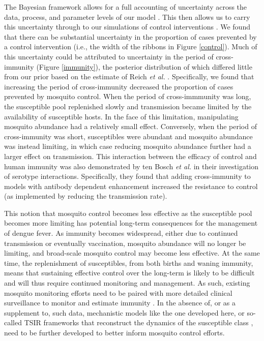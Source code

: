 \documentclass[10pt,letterpaper]{article}
\begin{document}
The Bayesian framework allows for a full accounting of uncertainty across the data, process, and parameter levels of our model \cite{Berliner1996}.
This then allows us to carry this uncertainty through to our simulations of control interventions \cite{Elderd2006}.
We found that there can be substantial uncertainty in the proportion of cases prevented by a control intervention (i.e., the width of the ribbons in Figure \ref{control}).
Much of this uncertainty could be attributed to uncertainty in the period of cross-immunity (Figure \ref{immunity}), the posterior distribution of which differed little from our prior based on the estimate of Reich \emph{et al.} \cite{Reich2013}.
Specifically, we found that increasing the period of cross-immunity decreased the proportion of cases prevented by mosquito control.
When the period of cross-immmunity was long, the susceptible pool replenished slowly and transmission became limited by the availability of susceptible hosts.
In the face of this limitation, manipulating mosquito abundance had a relatively small effect.
Conversely, when the period of cross-immunity was short, susceptibles were abundant and mosquito abundance was instead limiting, in which case reducing mosquito abundance further had a larger effect on transmission.
This interaction between the efficacy of control and human immunity was also demonstrated by ten Bosch \emph{et al.} \cite{TenBosch2016} in their investigation of serotype interactions.
Specifically, they found that adding cross-immunity to models with antibody dependent enhancement increased the resistance to control (as implemented by reducing the transmission rate).

This notion that mosquito control becomes less effective as the susceptible pool becomes more limiting has potential long-term consequences for the management of dengue fever.
As immunity becomes widespread, either due to continued transmission or eventually vaccination, mosquito abundance will no longer be limiting, and broad-scale mosquito control may become less effective.
At the same time, the replenishment of susceptibles, from both births and waning immunity, means that sustaining effective control over the long-term is likely to be difficult \cite{Scott2010b} and will thus require continued monitoring and management.
As such, existing mosquito monitoring efforts need to be paired with more detailed clinical surveillance to monitor and estimate immunity \cite{Morrison2008}.
In the absence of, or as a supplement to, such data, mechanistic models like the one developed here, or so-called TSIR frameworks that reconstruct the dynamics of the susceptible class \cite{Finkenstadt2000, Reich2013}, need to be further developed to better inform mosquito control efforts.
\end{document}

